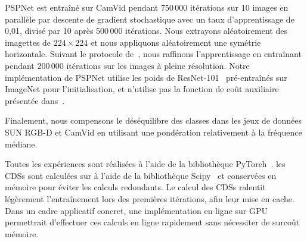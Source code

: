 PSPNet est entraîné sur CamVid pendant 750\,000 itérations sur 10 images en parallèle par descente de gradient stochastique avec un taux d'apprentissage de 0,01, divisé par 10 après 500\,000 itérations. Nous extrayons aléatoirement des imagettes de $224\times224$ et nous appliquons aléatoirement une symétrie horizontale. Suivant le protocole de~\cite{jegou_one_2017}, nous raffinons l'apprentissage en entraînant pendant 200\,000 itérations sur les images à pleine résolution.
Notre implémentation de PSPNet utilise les poids de ResNet-101~\cite{he_deep_2016} pré-entraînés sur ImageNet pour l'initialisation, et n'utilise pas la fonction de coût auxiliaire présentée dans~\cite{zhao_pyramid_2017}.

Finalement, nous compensons le déséquilibre des classes dans les jeux de données SUN RGB-D et CamVid en utilisant une pondération relativement à la fréquence médiane.

Toutes les expériences sont réalisées à l'aide de la bibliothèque PyTorch~\cite{noauthor_pytorch_2016}. les \glspl{CDS} sont calculées sur  à l'aide de la bibliothèque Scipy~\cite{jones_scipy_2001} et conservées en mémoire pour éviter les calculs redondants. Le calcul des \glspl{CDS} ralentit légèrement l'entraînement lors des premières itérations, afin leur mise en cache. Dans un cadre applicatif concret, une implémentation en ligne sur GPU~\cite{zampirolli_fast_2017} permettrait d'effectuer ces calculs en ligne rapidement sans nécessiter de surcoût mémoire.

